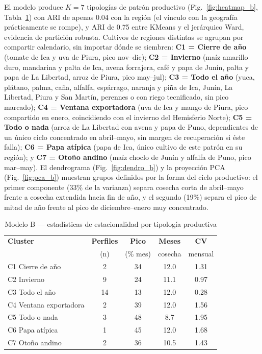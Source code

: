 \documentclass[conference]{IEEEtran}
\begin{document}
El modelo produce $K=7$ tipologías de patrón productivo (Fig.~\ref{fig:heatmap_b}, Tabla~\ref{tab:modelo_b}) con ARI de apenas 0.04 con la región (el vínculo con la geografía prácticamente se rompe), y ARI de 0.75 entre KMeans y el jerárquico Ward, evidencia de partición robusta. Cultivos de regiones distintas se agrupan por compartir calendario, sin importar dónde se siembren: \textbf{C1 = Cierre de año} (tomate de Ica y uva de Piura, pico nov--dic); \textbf{C2 = Invierno} (maíz amarillo duro, mandarina y palta de Ica, avena forrajera, café y papa de Junín, palta y papa de La Libertad, arroz de Piura, pico may--jul); \textbf{C3 = Todo el año} (yuca, plátano, palma, caña, alfalfa, espárrago, naranja y piña de Ica, Junín, La Libertad, Piura y San Martín, perennes o con riego tecnificado, sin pico marcado); \textbf{C4 = Ventana exportadora} (uva de Ica y mango de Piura, pico compartido en enero, coincidiendo con el invierno del Hemisferio Norte); \textbf{C5 = Todo o nada} (arroz de La Libertad con avena y papa de Puno, dependientes de un único ciclo concentrado en abril--mayo, sin margen de recuperación si éste falla); \textbf{C6 = Papa atípica} (papa de Ica, único cultivo de este patrón en su región); y \textbf{C7 = Otoño andino} (maíz choclo de Junín y alfalfa de Puno, pico mar--may). El dendrograma (Fig.~\ref{fig:dendro_b}) y la proyección PCA (Fig.~\ref{fig:pca_b}) muestran grupos definidos por la forma del ciclo productivo: el primer componente (33\% de la varianza) separa cosecha corta de abril--mayo frente a cosecha extendida hacia fin de año, y el segundo (19\%) separa el pico de mitad de año frente al pico de diciembre--enero muy concentrado.

\begin{table}[h]
\centering
\caption{Modelo B --- estadísticas de estacionalidad por tipología productiva}
\label{tab:modelo_b}
\small
\begin{tabular}{l c c c c}
\toprule
\textbf{Cluster} & \textbf{Perfiles} & \textbf{Pico} & \textbf{Meses} & \textbf{CV} \\
 & (n) & (\% mes) & cosecha & mensual \\
\midrule
C1 Cierre de año & 2 & 34 & 12.0 & 1.31 \\
C2 Invierno & 9 & 24 & 11.1 & 0.97 \\
C3 Todo el año & 14 & 13 & 12.0 & 0.28 \\
C4 Ventana exportadora & 2 & 39 & 12.0 & 1.56 \\
C5 Todo o nada & 3 & 48 & 8.7 & 1.95 \\
C6 Papa atípica & 1 & 45 & 12.0 & 1.68 \\
C7 Otoño andino & 2 & 36 & 10.5 & 1.43 \\
\bottomrule
\end{tabular}
\end{table}
\end{document}
